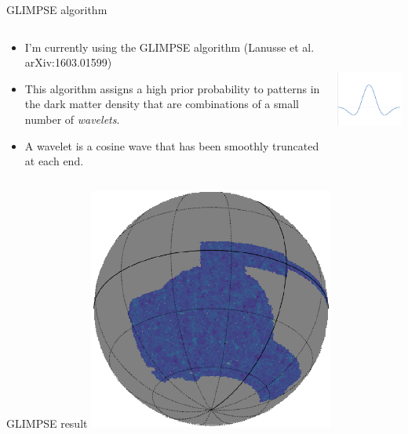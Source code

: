 \documentclass[usenames,dvipsnames]{beamer}
\begin{document}
\begin{frame}{GLIMPSE algorithm}
  \begin{columns}
    \begin{block}{}
      \begin{itemize}
        \item{I'm currently using the GLIMPSE algorithm (Lanusse et al. arXiv:1603.01599)}
        \item{This algorithm assigns a high prior probability to patterns in the dark matter density that are combinations of a small number of \textit{wavelets}.}
        \item{A wavelet is a cosine wave that has been smoothly truncated at each end.}
      \end{itemize}
    \end{block}
    \centering
    \includegraphics[height=4cm]{diagram_7.png}
  \end{columns}
\end{frame}

\begin{frame}{GLIMPSE result}
    \centering
    \includegraphics[height=8cm]{buzzard_192.png}
\end{frame}




 
\end{document}

